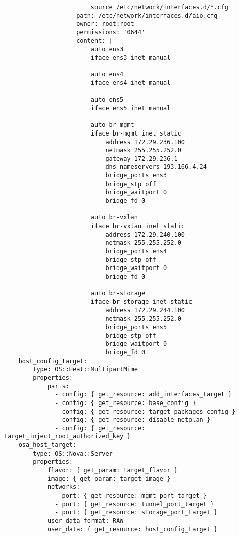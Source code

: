 \begin{verbatim}
                        source /etc/network/interfaces.d/*.cfg
                  - path: /etc/network/interfaces.d/aio.cfg
                    owner: root:root
                    permissions: '0644'
                    content: |
                        auto ens3
                        iface ens3 inet manual

                        auto ens4
                        iface ens4 inet manual

                        auto ens5
                        iface ens5 inet manual

                        auto br-mgmt
                        iface br-mgmt inet static
                            address 172.29.236.100
                            netmask 255.255.252.0
                            gateway 172.29.236.1
                            dns-nameservers 193.166.4.24
                            bridge_ports ens3
                            bridge_stp off
                            bridge_waitport 0
                            bridge_fd 0

                        auto br-vxlan
                        iface br-vxlan inet static
                            address 172.29.240.100
                            netmask 255.255.252.0
                            bridge_ports ens4
                            bridge_stp off
                            bridge_waitport 0
                            bridge_fd 0

                        auto br-storage
                        iface br-storage inet static
                            address 172.29.244.100
                            netmask 255.255.252.0
                            bridge_ports ens5
                            bridge_stp off
                            bridge_waitport 0
                            bridge_fd 0
    host_config_target:
        type: OS::Heat::MultipartMime
        properties:
            parts:
              - config: { get_resource: add_interfaces_target }
              - config: { get_resource: base_config }
              - config: { get_resource: target_packages_config }
              - config: { get_resource: disable_netplan }
              - config: { get_resource: target_inject_root_authorized_key }
    osa_host_target:
        type: OS::Nova::Server
        properties:
            flavor: { get_param: target_flavor }
            image: { get_param: target_image }
            networks:
              - port: { get_resource: mgmt_port_target }
              - port: { get_resource: tunnel_port_target }
              - port: { get_resource: storage_port_target }
            user_data_format: RAW
            user_data: { get_resource: host_config_target }
\end{verbatim}


